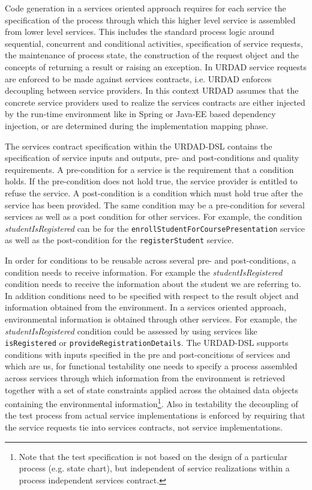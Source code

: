 Code generation in a services oriented approach requires for each service the specification of the process through which this higher level service is assembled from lower level services. This includes the standard process logic around sequential, concurrent and conditional activities, specification of service requests, the maintenance of process state, the construction of the request object and the concepts of returning a result or raising an exception. In URDAD service requests are enforced to be made against services contracts, i.e. URDAD enforces decoupling between service providers. In this context URDAD assumes that the concrete service providers used to realize the services contracts are either injected by the run-time environment like in Spring or Java-EE based dependency injection, or are determined during the implementation mapping phase.

The services contract specification within the URDAD-DSL contains the specification of service inputs and outputs, pre- and post-conditions and quality requirements. A pre-condition for a service is the requirement that a condition holds. If the pre-condition does not hold true, the service provider is entitled to refuse the service. A post-condition is a condition which must hold true after the service has been provided. The same condition may be a pre-condition for several services as well as a post condition for other services. For example, the condition \emph{studentIsRegistered} can be for the \verb+enrollStudentForCoursePresentation+ service as well as the post-condition for the \verb+registerStudent+ service. 

In order for conditions to be reusable across several pre- and post-conditions, a condition needs to receive information. For example the \emph{studentIsRegistered} condition needs to receive the information about the student we are referring to. In addition conditions need to be specified with respect to the result object and information obtained from the environment. In a services oriented approach, environmental information is obtained through other services. For example, the \emph{studentIsRegistered} condition could be assessed by using services like \verb+isRegistered+ or \verb+provideRegistrationDetails+. The URDAD-DSL supports conditions with inputs specified in the pre and post-concitions of services and which are us, for functional testability one needs to specify a process assembled across services through which information from the environment is retrieved together with a set of state constraints applied across the obtained data objects containing the environmental information\footnote{Note that the test specification is not based on the design of a particular process (e.g. state chart), but independent of service realizations within a process independent services contract.}. Also in testability the decoupling of the test process from actual service implementations is enforced by requiring that the service requests tie into services contracts, not service implementations. 
 

